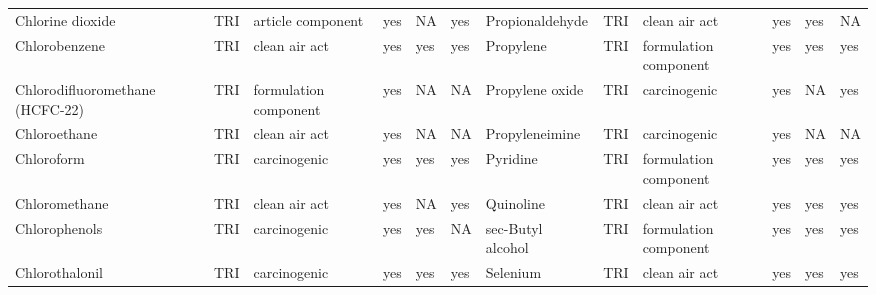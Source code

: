\begin{table}[H]
{\begin{tabular}{llllllllllll}
            Chlorine dioxide                                                           & TRI            & article component     & yes    & NA      & yes  & Propionaldehyde                                                                                                    & TRI            & clean air act & yes & yes & NA\\
            Chlorobenzene                                                              & TRI            & clean air act         & yes    & yes     & yes  & Propylene                                                                                                          & TRI            & formulation component & yes & yes & yes\\
            Chlorodifluoromethane (HCFC-22)                                            & TRI            & formulation component & yes    & NA      & NA   & Propylene oxide & TRI & carcinogenic & yes & NA & yes\\
            Chloroethane                                                               & TRI            & clean air act         & yes    & NA      & NA   & Propyleneimine                                                                                                     & TRI            & carcinogenic          & yes    & NA      & NA   \\
            Chloroform                                                                 & TRI            & carcinogenic          & yes    & yes     & yes  & Pyridine                                                                                                           & TRI            & formulation component & yes    & yes & yes\\
            Chloromethane                                                              & TRI            & clean air act         & yes    & NA      & yes  & Quinoline                                                                                                          & TRI            & clean air act         & yes    & yes     & yes  \\
            Chlorophenols                                                              & TRI            & carcinogenic          & yes    & yes     & NA   & sec-Butyl alcohol                                                                                                  & TRI            & formulation component & yes & yes & yes\\
            Chlorothalonil                                                             & TRI            & carcinogenic          & yes    & yes     & yes  & Selenium                                                                                                           & TRI            & clean air act         & yes    & yes     & yes  \\

\end{tabular}}
\end{table}

